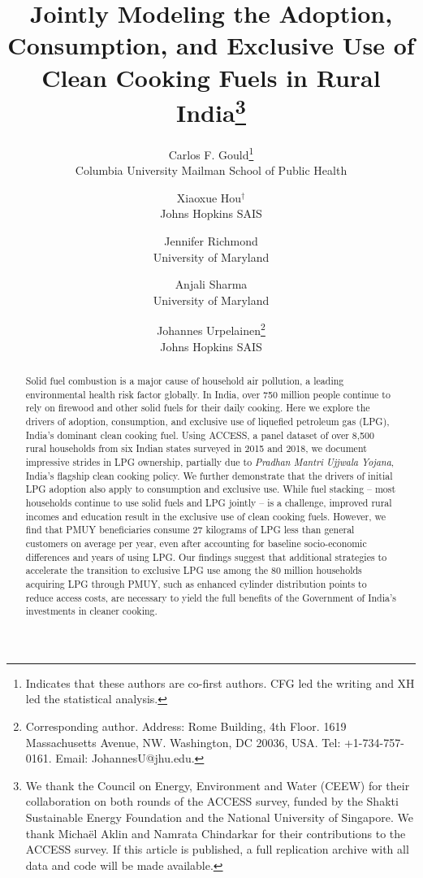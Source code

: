 \documentclass[11pt,english]{article}
\theoremstyle{plain} \newtheorem{claim}{Claim}
\theoremstyle{plain} \newtheorem{prop}{Proposition}
\theoremstyle{plain} \newtheorem{hypo}{Hypothesis}
\begin{document}
 

\title{Jointly Modeling the Adoption, Consumption, and Exclusive Use of Clean Cooking Fuels in Rural India\thanks{We thank the Council on Energy, Environment and Water (CEEW) for their collaboration on both rounds of the ACCESS survey, funded by the Shakti Sustainable Energy Foundation and the National University of Singapore. We thank Micha\"{e}l Aklin and Namrata Chindarkar for their contributions to the ACCESS survey. If this article is published, a full replication archive with all data and code will be made available.}}

\author{Carlos F. Gould\footnote{Indicates that these authors are co-first authors. CFG led the writing and XH led the statistical analysis.}\\Columbia University Mailman School of Public Health\and  Xiaoxue Hou$^\dagger$\\Johns Hopkins SAIS \and Jennifer Richmond\\University of Maryland \and Anjali Sharma\\University of Maryland \and Johannes Urpelainen\footnote{Corresponding author. Address: Rome Building, 4th Floor. 1619 Massachusetts Avenue, NW. Washington, DC 20036, USA. Tel: +1-734-757-0161. Email: JohannesU@jhu.edu.}\\Johns Hopkins SAIS}

\maketitle

\begin{abstract}
Solid fuel combustion is a major cause of household air pollution, a leading environmental health risk factor globally. In India, over 750 million people continue to rely on firewood and other solid fuels for their daily cooking. Here we explore the drivers of adoption, consumption, and exclusive use of liquefied petroleum gas (LPG), India's dominant clean cooking fuel. Using ACCESS, a panel dataset of over 8,500 rural households from six Indian states surveyed in 2015 and 2018, we document impressive strides in LPG ownership, partially due to \emph{Pradhan Mantri Ujjwala Yojana}, India's flagship clean cooking policy. We further demonstrate that the drivers of initial LPG adoption also apply to consumption and exclusive use. While fuel stacking -- most households continue to use solid fuels and LPG jointly -- is a challenge, improved rural incomes and education result in the exclusive use of clean cooking fuels. However, we find that PMUY beneficiaries consume 27 kilograms of LPG less than general customers on average per year, even after accounting for baseline socio-economic differences and years of using LPG. Our findings suggest that additional strategies to accelerate the transition to exclusive LPG use among the 80 million households acquiring LPG through PMUY, such as enhanced cylinder distribution points to reduce access costs, are necessary to yield the full benefits of the Government of India's investments in cleaner cooking.
\end{abstract}
\end{document}
